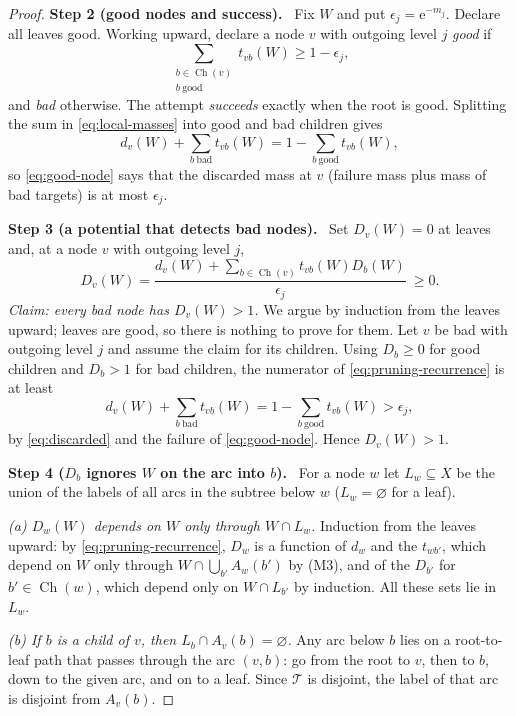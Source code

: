\documentclass[11pt]{article}
\numberwithin{equation}{section}
\newcommand{\TT}{\mathcal T}
\newcommand{\ch}{\operatorname{Ch}}
\newcommand{\ee}{\mathrm e}
\newcommand{\step}[2]{\par\medskip\noindent\textbf{Step #1 (#2).}\ }
\begin{document}
\begin{proof}
\step{2}{good nodes and success}
Fix $W$ and put $\epsilon_j=\ee^{-m_j}$. Declare all leaves good.
Working upward, declare a node $v$ with outgoing level $j$ \emph{good}
if
\begin{equation}\label{eq:good-node}
 \sum_{\substack{b\in\ch(v)\\b\ \mathrm{good}}}t_{vb}(W)
 \ge1-\epsilon_j,
\end{equation}
and \emph{bad} otherwise. The attempt \emph{succeeds} exactly when the
root is good. Splitting the sum in \eqref{eq:local-masses} into good
and bad children gives
\begin{equation}\label{eq:discarded}
 d_v(W)+\sum_{b\ \mathrm{bad}}t_{vb}(W)
 =1-\sum_{b\ \mathrm{good}}t_{vb}(W),
\end{equation}
so \eqref{eq:good-node} says that the discarded mass at $v$ (failure
mass plus mass of bad targets) is at most $\epsilon_j$.

\step{3}{a potential that detects bad nodes}
Set $D_v(W)=0$ at leaves and, at a node $v$ with outgoing level $j$,
\begin{equation}\label{eq:pruning-recurrence}
 D_v(W)=\frac{d_v(W)+\sum_{b\in\ch(v)}t_{vb}(W)D_b(W)}{\epsilon_j}\ \ge0.
\end{equation}
\emph{Claim: every bad node has $D_v(W)>1$.} We argue by induction from
the leaves upward; leaves are good, so there is nothing to prove for
them. Let $v$ be bad with outgoing level $j$ and assume the claim for
its children. Using $D_b\ge0$ for good children and $D_b>1$ for bad
children, the numerator of \eqref{eq:pruning-recurrence} is at least
\[
 d_v(W)+\sum_{b\ \mathrm{bad}}t_{vb}(W)
 =1-\sum_{b\ \mathrm{good}}t_{vb}(W)>\epsilon_j,
\]
by \eqref{eq:discarded} and the failure of \eqref{eq:good-node}.
Hence $D_v(W)>1$.

\step{4}{$D_b$ ignores $W$ on the arc into $b$}
For a node $w$ let $L_w\subseteq X$ be the union of the labels of all
arcs in the subtree below $w$ ($L_w=\varnothing$ for a leaf).

\emph{(a) $D_w(W)$ depends on $W$ only through $W\cap L_w$.} Induction
from the leaves upward: by \eqref{eq:pruning-recurrence}, $D_w$ is a
function of $d_w$ and the $t_{wb'}$, which depend on $W$ only through
$W\cap\bigcup_{b'}A_w(b')$ by (M3), and of the $D_{b'}$ for
$b'\in\ch(w)$, which depend only on $W\cap L_{b'}$ by induction. All
these sets lie in $L_w$.

\emph{(b) If $b$ is a child of $v$, then
$L_b\cap A_v(b)=\varnothing$.} Any arc below $b$ lies on a root-to-leaf
path that passes through the arc $(v,b)$: go from the root to $v$, then
to $b$, down to the given arc, and on to a leaf. Since $\TT$ is
disjoint, the label of that arc is disjoint from $A_v(b)$.


\end{proof}
\end{document}
